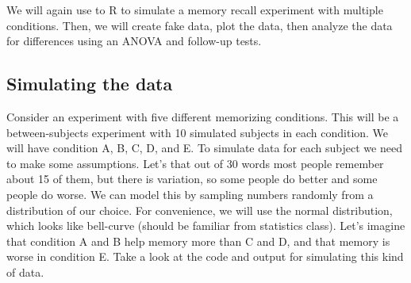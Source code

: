 We will again use to R to simulate a memory recall experiment with
multiple conditions. Then, we will create fake data, plot the data, then
analyze the data for differences using an ANOVA and follow-up tests.

\subsection{Simulating the data}\label{simulating-the-data}

Consider an experiment with five different memorizing conditions. This
will be a between-subjects experiment with 10 simulated subjects in each
condition. We will have condition A, B, C, D, and E. To simulate data
for each subject we need to make some assumptions. Let's that out of 30
words most people remember about 15 of them, but there is variation, so
some people do better and some people do worse. We can model this by
sampling numbers randomly from a distribution of our choice. For
convenience, we will use the normal distribution, which looks like
bell-curve (should be familiar from statistics class). Let's imagine
that condition A and B help memory more than C and D, and that memory is
worse in condition E. Take a look at the code and output for simulating
this kind of data.

\begin{Shaded}
\begin{Highlighting}[]
\NormalTok{(}\NormalTok{(}\NormalTok{,}\NormalTok{,}\NormalTok{))}
\NormalTok{(}\NormalTok{(}\NormalTok{,}\NormalTok{,}\NormalTok{))}
\NormalTok{(}\NormalTok{(}\NormalTok{,}\NormalTok{,}\NormalTok{))}
\NormalTok{(}\NormalTok{(}\NormalTok{,}\NormalTok{,}\NormalTok{))}
\NormalTok{(}\NormalTok{(}\NormalTok{,}\NormalTok{,}\NormalTok{))}
\NormalTok{)}
\end{Highlighting}
\end{Shaded}

